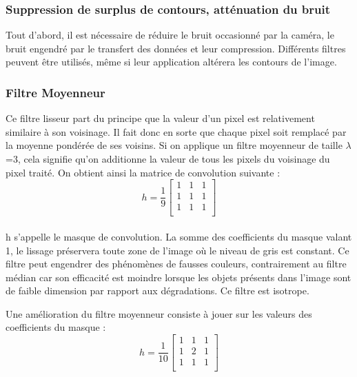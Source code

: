 \subsubsection*{Suppression de surplus de contours, atténuation du bruit}
\label{Filtre}

Tout d’abord, il est nécessaire de réduire le bruit occasionné par la caméra, le bruit engendré par le transfert des données et leur compression. Différents filtres \cite{bergounioux2010quelques} peuvent être utilisés, même si leur application altérera les contours de l’image. 

\subsubsection*{Filtre Moyenneur}

Ce filtre lisseur part du principe que la valeur d'un pixel est relativement similaire à son voisinage. Il fait donc en sorte que chaque pixel soit remplacé par la moyenne pondérée de ses voisins. Si on applique un filtre moyenneur de taille $\lambda$=3, cela signifie qu'on additionne la valeur de tous les pixels du voisinage du pixel traité. On obtient ainsi la matrice de convolution suivante :
$$h = \frac{1}{9}
\begin{bmatrix}
	1 & 1 & 1 \\
	1 & 1 & 1 \\
	1 & 1 & 1 \\
\end{bmatrix}  $$

\paragraph{}
h s’appelle le masque de convolution. La somme des coefficients du masque valant 1, le lissage préservera toute zone de l’image où le niveau de gris est constant. Ce filtre peut engendrer des phénomènes de fausses couleurs, contrairement au filtre médian car son efficacité est moindre lorsque les objets présents dans l'image sont de faible dimension par rapport aux dégradations. Ce filtre est isotrope. 

Une amélioration du filtre moyenneur consiste à jouer sur les valeurs des coefficients du masque :
$$h = \frac{1}{10}
\begin{bmatrix}
	1 & 1 & 1 \\
	1 & 2 & 1 \\
	1 & 1 & 1 \\
\end{bmatrix}  $$

